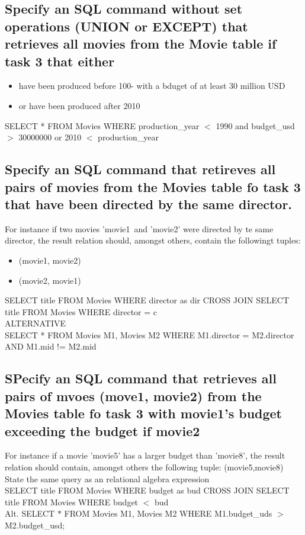\documentclass[12pt, a4paper]{article}
\begin{document}
		\subsection{Specify an SQL command without set operations (UNION or EXCEPT) that retrieves all movies from the Movie table if task 3 that either}
		\begin{itemize}
			\item have been produced before 100- with a bduget of at least 30 million USD
			\item or have been produced after 2010
		\end{itemize}
		SELECT * FROM Movies WHERE production\_year $<$ 1990 and budget\_usd $>$ 30000000 or 2010 $<$ production\_year \\
		\subsection{Specify an SQL command that retireves all pairs of movies from the Movies table fo task 3 that have been directed by the same director.}
		For instance if two movies 'movie1\ and 'movie2' were directed by te same director, the result relation should, amongst others, contain the followingt tuples:
		\begin{itemize}
			\item (movie1, movie2)
			\item (movie2, movie1)
		\end{itemize}
		SELECT title FROM Movies WHERE director as dir CROSS JOIN SELECT title FROM Movies WHERE director = c \\
		ALTERNATIVE\\
		SELECT * FROM Movies M1, Movies M2 WHERE M1.director = M2.director AND M1.mid != M2.mid
		\subsection{SPecify an SQL command that retrieves all pairs of mvoes (move1, movie2) from the Movies table fo task 3 with movie1's budget exceeding the budget if movie2}
			For instance if a movie 'movie5' has a larger budget than 'movie8', the result relation should contain, amongst others the following tuple: (movie5,movie8)\\
			State the same query as an relational algebra expression\\
		SELECT title FROM Movies WHERE budget as bud CROSS JOIN SELECT title FROM Movies WHERE budget $<$ bud\\
		Alt. SELECT $*$ FROM Movies M1, Movies M2 WHERE M1.budget\_uds $>$ M2.budget\_usd;
	\setcounter{subsection}{0}
\end{document}
